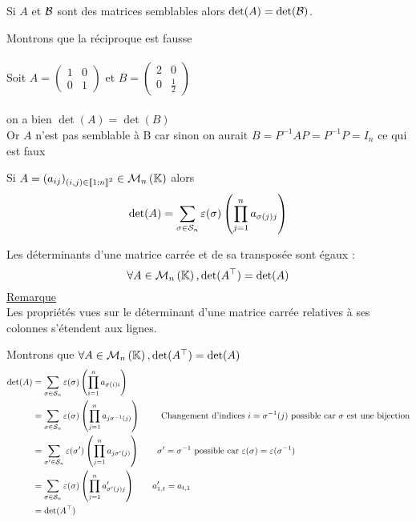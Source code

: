 \begin{defprop}
    Si \(A\) et \(\cal{B}\) sont des matrices semblables alors \(\det(A) = \det(\cal{B})\).
\end{defprop}
\begin{dem}
    Montrons que la réciproque est fausse \\~\\
    Soit \(A = \begin{pmatrix}
        1 & 0\\
        0 & 1
    \end{pmatrix}\) et \(B = \begin{pmatrix}
        2 & 0\\
        0 & \frac{1}{2}
    \end{pmatrix}\)\\~\\
    on a bien \(\det(A) = \det(B)\) \\
    Or \(A\) n'est pas semblable à B car sinon on aurait \(B = P^{-1} A P = P^{-1} P = I_n\) ce qui est faux
\end{dem}
\begin{defprop}
    Si \(A = (a_{ij} )_{(i,j)\in \interventierii{1}{n}^2} \in \M{n}\) alors
    \[\det (A) = \sum_{\sigma \in \cal{S}_n} \epsilon (\sigma ) \paren{\prod^n_{j=1} a_{\sigma(j)j}}\]
\end{defprop}

\begin{defprop}
    Les déterminants d’une matrice carrée et de sa transposée sont égaux :
    \[\forall A \in  \M{n} , \det(\trans{A}) = \det(A)\]
    \underline{Remarque}\\
    Les propriétés vues sur le déterminant d’une matrice carrée relatives à ses colonnes s’étendent aux lignes.
\end{defprop}
\begin{dem}
    Montrons que \(\forall A \in  \M{n} , \det(\trans{A}) = \det(A)\)
    \begin{align*}
        \det(A) &= \sum_{\sigma \in \cal{S}_n} \epsilon (\sigma ) \paren{\prod^{n}_{i=1} a_{\sigma (i)i}}\\
        &= \sum_{\sigma \in \cal{S}_n} \epsilon (\sigma ) \paren{\prod^{n}_{j=1} a_{j\sigma^{-1}(j)}}\qquad \text{ Changement d'indices }i = \sigma^{-1}(j) \text{ possible car } \sigma \text{ est une bijection} \\
        & = \sum_{\sigma' \in \cal{S}_n} \epsilon (\sigma' ) \paren{\prod^{n}_{j=1} a_{j\sigma'(j)}} \qquad \sigma ' = \sigma^{-1} \text{ possible car } \epsilon(\sigma) = \epsilon(\sigma^{-1})\\
        &=\sum_{\sigma \in \cal{S}_n} \epsilon (\sigma ) \paren{\prod^{n}_{j=1} a'_{\sigma'(j)j}} \qquad a'_{1,t} = a_{t,1}\\
        &=\det(\trans{A})
    \end{align*}
\end{dem}
